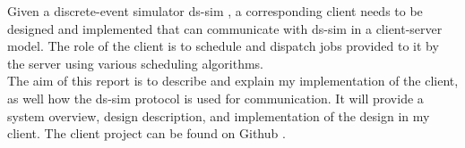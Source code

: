 Given a discrete-event simulator ds-sim \cite{ds-sim}, a corresponding client needs to be designed and implemented that can communicate with ds-sim in a client-server model. The role of the client is to schedule and dispatch jobs provided to it by the server using various scheduling algorithms. \\

\vspace{.2cm}
The aim of this report is to describe and explain my implementation of the client, as well how the ds-sim protocol is used for communication. It will provide a system overview, design description, and implementation of the design in my client. The client project can be found on Github \cite{github}.